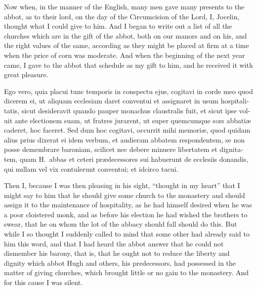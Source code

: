 \documentclass[10pt]{book}
\begin{document}
\begin{paracol}{2}
\begin{otherlanguage}{latin}
\end{otherlanguage}

\switchcolumn

Now when, in the manner of the English, many men gave many presents to the abbot, as to their lord, on the day of the Circumcision of the Lord, I, Jocelin, thought what I could give to him. And I began to write out a list of all the churches which are in the gift of the abbot, both on our manors and on his, and the right values of the same, according as they might be placed at firm at a time when the price of corn was moderate. And when the beginning of the next year came, I gave to the abbot that schedule as my gift to him, and he received it with great pleasure.

\switchcolumn*

\begin{otherlanguage}{latin}
Ego vero, quia placui tunc temporis in conspectu ejus, cogitavi in corde meo quod dicerem ei, ut aliquam ecclesiam daret conventui et assignaret in usum hospitalitatis, sicut desideravit quando pauper monachus claustralis fuit, et sicut ipse voluit ante electionem suam, ut fratres jurarent, ut super quemcumque sors abbati\ae{} caderet, hoc faceret. Sed dum hoc cogitavi, occurrit mihi memori\ae{}, quod quidam alius prius dixerat ei idem verbum, et audieram abbatem respondentem, se non posse demembrare baroniam, scilicet nec debere minuere libertatem et dignitatem, quam H.\ abbas et ceteri pr\ae{}decessores sui habuerunt de ecclesiis donandis, qui nullam vel vix contulerunt conventui; et idcirco tacui.
\end{otherlanguage}

\switchcolumn

Then I, because I was then pleasing in his sight, ``thought in my heart'' that I might say to him that he should give some church to the monastery and should assign it to the maintenance of hospitality, as he had himself desired when he was a poor cloistered monk, and as before his election he had wished the brothers to swear, that he on whom the lot of the abbacy should fall should do this. But while I so thought I suddenly called to mind that some other had already said to him this word, and that I had heard the abbot answer that he could not dismember his barony, that is, that he ought not to reduce the liberty and dignity which abbot Hugh and others, his predecessors, had possessed in the matter of giving churches, which brought little or no gain to the monastery. And for this cause I was silent.


\end{paracol}
\end{document}
